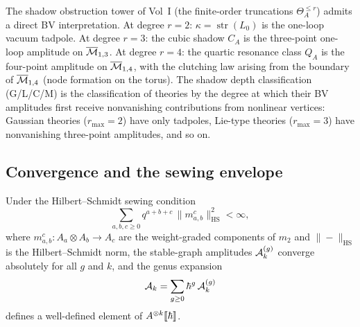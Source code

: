 \begin{remark}
The shadow obstruction tower of Vol~I (the finite-order truncations
$\Theta_A^{\le r}$) admits a direct BV interpretation.
At degree $r = 2$: $\kappa = \operatorname{str}(L_0)$ is the
one-loop vacuum tadpole. At degree $r = 3$: the cubic shadow
$C_A$ is the three-point one-loop amplitude on
$\overline{\mathcal{M}}_{1,3}$. At degree $r = 4$: the quartic resonance
class $Q_A$ is the four-point amplitude on $\overline{\mathcal{M}}_{1,4}$,
with the clutching law arising from the boundary of
$\overline{\mathcal{M}}_{1,4}$ (node formation on the torus). The
shadow depth classification (G/L/C/M) is the classification of
theories by the degree at which their BV amplitudes first receive
nonvanishing contributions from nonlinear vertices: Gaussian
theories ($r_{\max} = 2$) have only tadpoles, Lie-type theories
($r_{\max} = 3$) have nonvanishing three-point amplitudes, and
so on.
\end{remark}

\subsection{Convergence and the sewing envelope}

\begin{proposition}
Under the Hilbert--Schmidt sewing condition
\begin{equation}
\sum_{a,b,c \ge 0} q^{a+b+c}\,
\|m^c_{a,b}\|_{\mathrm{HS}}^2 < \infty,
\end{equation}
where $m^c_{a,b} : A_a \otimes A_b \to A_c$ are the
weight-graded components of $m_2$ and $\|-\|_{\mathrm{HS}}$ is
the Hilbert--Schmidt norm, the stable-graph amplitudes
$\mathcal{A}_k^{(g)}$ converge absolutely for all $g$ and $k$, and the
genus expansion
\[
\mathcal{A}_k = \sum_{g \ge 0} \hbar^g\,\mathcal{A}_k^{(g)}
\]
defines a well-defined element of $A^{\otimes k}\llbracket\hbar\rrbracket$.
\end{proposition}

